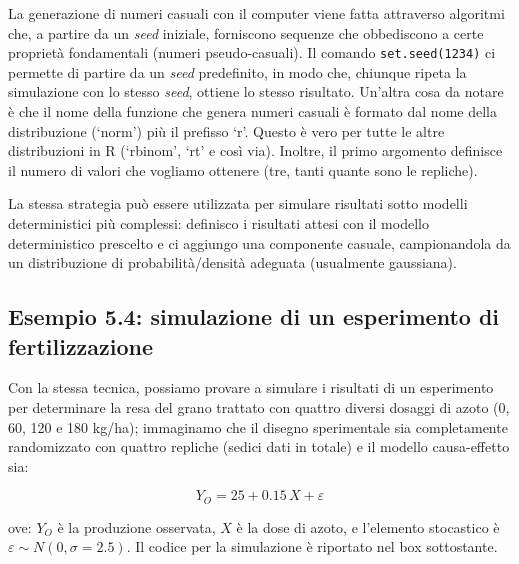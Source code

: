 \documentclass[
  12pt,
]{book}
\begin{document}
La generazione di numeri casuali con il computer viene fatta attraverso algoritmi che, a partire da un \emph{seed} iniziale, forniscono sequenze che obbediscono a certe proprietà fondamentali (numeri pseudo-casuali). Il comando \texttt{set.seed(1234)} ci permette di partire da un \emph{seed} predefinito, in modo che, chiunque ripeta la simulazione con lo stesso \emph{seed}, ottiene lo stesso risultato. Un'altra cosa da notare è che il nome della funzione che genera numeri casuali è formato dal nome della distribuzione (`norm') più il prefisso `r'. Questo è vero per tutte le altre distribuzioni in R (`rbinom', `rt' e così via). Inoltre, il primo argomento definisce il numero di valori che vogliamo ottenere (tre, tanti quante sono le repliche).

La stessa strategia può essere utilizzata per simulare risultati sotto modelli deterministici più complessi: definisco i risultati attesi con il modello deterministico prescelto e ci aggiungo una componente casuale, campionandola da un distribuzione di probabilità/densità adeguata (usualmente gaussiana).

\hypertarget{esempio-5.4-simulazione-di-un-esperimento-di-fertilizzazione}{%
\subsection{Esempio 5.4: simulazione di un esperimento di fertilizzazione}\label{esempio-5.4-simulazione-di-un-esperimento-di-fertilizzazione}}

Con la stessa tecnica, possiamo provare a simulare i risultati di un esperimento per determinare la resa del grano trattato con quattro diversi dosaggi di azoto (0, 60, 120 e 180 kg/ha); immaginamo che il disegno sperimentale sia completamente randomizzato con quattro repliche (sedici dati in totale) e il modello causa-effetto sia:

\[Y_O = 25 + 0.15 \, X + \varepsilon\]

ove: \(Y_O\) è la produzione osservata, \(X\) è la dose di azoto, e l'elemento stocastico è \(\varepsilon \sim N(0, \sigma = 2.5)\). Il
codice per la simulazione è riportato nel box sottostante.

\small
\vspace{12pt}
\end{document}
